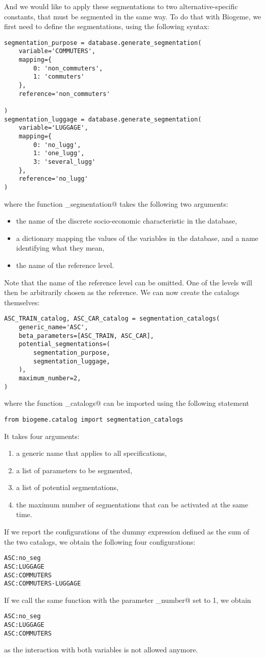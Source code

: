 \documentclass[12pt,a4paper]{article}
\newcommand{\PDBIOGEME}{Biogeme}
\begin{document}
And we would like to apply these segmentations to two alternative-specific constants, that must be segmented in the same way. To do that with \PDBIOGEME, we first need to define the segmentations, using the following syntax:
\begin{lstlisting}
segmentation_purpose = database.generate_segmentation(
    variable='COMMUTERS',
    mapping={
        0: 'non_commuters',
        1: 'commuters'
    },
    reference='non_commuters'
    
)
segmentation_luggage = database.generate_segmentation(
    variable='LUGGAGE',
    mapping={
        0: 'no_lugg',
        1: 'one_lugg',
        3: 'several_lugg'
    },
    reference='no_lugg'
)
\end{lstlisting}
where the function \lstinline@generate_segmentation@ takes the following two arguments:
\begin{itemize}
\item the name of the discrete socio-economic characteristic in the database,
\item a dictionary mapping the values of the variables in the database, and a name identifying what they mean,
\item the name of the reference level.
\end{itemize}
Note that the name of the reference level can be omitted. One of the
levels will then be arbitrarily chosen as the reference.
We can now create the catalogs themselves:
\begin{lstlisting}
ASC_TRAIN_catalog, ASC_CAR_catalog = segmentation_catalogs(
    generic_name='ASC',
    beta_parameters=[ASC_TRAIN, ASC_CAR],
    potential_segmentations=(
        segmentation_purpose,
        segmentation_luggage,
    ),
    maximum_number=2,
)
\end{lstlisting}
where the function \lstinline@segmentation_catalogs@ can be imported using the following statement
\begin{lstlisting}
from biogeme.catalog import segmentation_catalogs
\end{lstlisting}
It takes four arguments:
\begin{enumerate}
\item a generic name that applies to all specifications,
\item a list of parameters to be segmented,
\item a list of potential segmentations,
\item the maximum number of segmentations that can be activated at the same time. 
\end{enumerate}
If we report the configurations of the dummy expression defined as the sum of the two catalogs, we obtain the following four configurations:
\begin{lstlisting}
ASC:no_seg
ASC:LUGGAGE
ASC:COMMUTERS
ASC:COMMUTERS-LUGGAGE
\end{lstlisting}
If we call the same function with the parameter  \lstinline@maximum_number@ set to 1, we obtain 
\begin{lstlisting}
ASC:no_seg
ASC:LUGGAGE
ASC:COMMUTERS
\end{lstlisting}
as the interaction with both variables is not allowed anymore.
\end{document}
